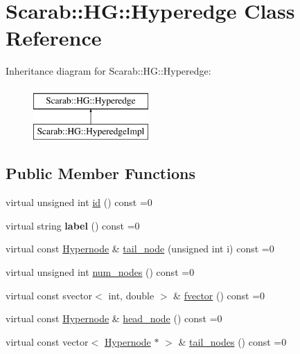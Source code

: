 \hypertarget{class_scarab_1_1_h_g_1_1_hyperedge}{
\section{Scarab::HG::Hyperedge Class Reference}
\label{class_scarab_1_1_h_g_1_1_hyperedge}
}
Inheritance diagram for Scarab::HG::Hyperedge:\begin{figure}[H]
\begin{center}
\leavevmode
\includegraphics[height=2cm]{class_scarab_1_1_h_g_1_1_hyperedge}
\end{center}
\end{figure}
\subsection*{Public Member Functions}
\begin{DoxyCompactItemize}
\item 
virtual unsigned int \hyperlink{class_scarab_1_1_h_g_1_1_hyperedge_af824beb7107253a7545b35992c17e057}{id} () const =0
\item 
\hypertarget{class_scarab_1_1_h_g_1_1_hyperedge_a8442c017fcee87c1f865b2254b49900f}{
virtual string {\bfseries label} () const =0}
\label{class_scarab_1_1_h_g_1_1_hyperedge_a8442c017fcee87c1f865b2254b49900f}

\item 
virtual const \hyperlink{class_scarab_1_1_h_g_1_1_hypernode}{Hypernode} \& \hyperlink{class_scarab_1_1_h_g_1_1_hyperedge_a9ec8cf9ea7b5f762f359a6f9f1c038da}{tail\_\-node} (unsigned int i) const =0
\item 
virtual unsigned int \hyperlink{class_scarab_1_1_h_g_1_1_hyperedge_a799d8d98242c129d7eee178bdf1fb535}{num\_\-nodes} () const =0
\item 
virtual const svector$<$ int, double $>$ \& \hyperlink{class_scarab_1_1_h_g_1_1_hyperedge_a0d201ddb955631aadee4c15cc8e709f8}{fvector} () const =0
\item 
virtual const \hyperlink{class_scarab_1_1_h_g_1_1_hypernode}{Hypernode} \& \hyperlink{class_scarab_1_1_h_g_1_1_hyperedge_a6043de341070c103d811f5286193dd46}{head\_\-node} () const =0
\item 
virtual const vector$<$ \hyperlink{class_scarab_1_1_h_g_1_1_hypernode}{Hypernode} $\ast$ $>$ \& \hyperlink{class_scarab_1_1_h_g_1_1_hyperedge_abac6d27691186608aa12949de6e1c283}{tail\_\-nodes} () const =0
\end{DoxyCompactItemize}


